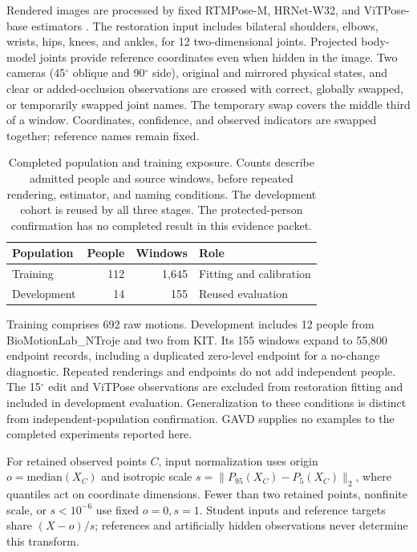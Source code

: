 \documentclass{article}
\newcommand{\degunit}{^{\circ}}
\begin{document}
Rendered images are processed by fixed RTMPose-M, HRNet-W32, and ViTPose-base estimators \citep{jiang2023rtmpose,sun2019hrnet,xu2022vitpose}. The restoration input includes bilateral shoulders, elbows, wrists, hips, knees, and ankles, for 12 two-dimensional joints. Projected body-model joints provide reference coordinates even when hidden in the image. Two cameras (45$\degunit$ oblique and 90$\degunit$ side), original and mirrored physical states, and clear or added-occlusion observations are crossed with correct, globally swapped, or temporarily swapped joint names. The temporary swap covers the middle third of a window. Coordinates, confidence, and observed indicators are swapped together; reference names remain fixed.

\begin{table}[h]\centering
\caption{Completed population and training exposure. Counts describe admitted people and source windows, before repeated rendering, estimator, and naming conditions. The development cohort is reused by all three stages. The protected-person confirmation has no completed result in this evidence packet.}
\label{tab:data}
\begin{tabular}{lrrl}\toprule
Population & People & Windows & Role \\\midrule
Training &112&1,645& Fitting and calibration\\
Development &14&155& Reused evaluation\\\bottomrule
\end{tabular}
\end{table}

Training comprises 692 raw motions. Development includes 12 people from BioMotionLab\_NTroje and two from KIT. Its 155 windows expand to 55,800 endpoint records, including a duplicated zero-level endpoint for a no-change diagnostic. Repeated renderings and endpoints do not add independent people. The 15$\degunit$ edit and ViTPose observations are excluded from restoration fitting and included in development evaluation. Generalization to these conditions is distinct from independent-population confirmation. GAVD supplies no examples to the completed experiments reported here.

For retained observed points $C$, input normalization uses origin $o=\mathrm{median}(X_C)$ and isotropic scale $s=\|P_{95}(X_C)-P_5(X_C)\|_2$, where quantiles act on coordinate dimensions. Fewer than two retained points, nonfinite scale, or $s<10^{-6}$ use fixed $o=0,s=1$. Student inputs and reference targets share $(X-o)/s$; references and artificially hidden observations never determine this transform.
\end{document}
